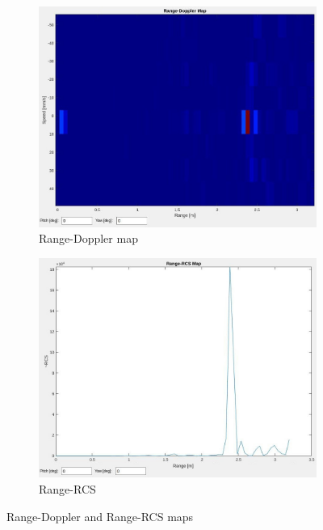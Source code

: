 \begin{figure}[h!]
  \centering
  \begin{subfigure}[b]{0.46\textwidth}
    \centering
    \includegraphics[width=\textwidth]{../img/vis_range_dop.jpg}
    \caption{Range-Doppler map}
  \end{subfigure}
  \hspace{0.02\textwidth}
  \begin{subfigure}[b]{0.46\textwidth}
    \centering
    \includegraphics[width=\textwidth]{../img/vis_range_rcs.jpg}
    \caption{Range-RCS }
  \end{subfigure}
	\caption{Range-Doppler and Range-RCS maps}
  \label{fig:rd_rr_map}
\end{figure}


